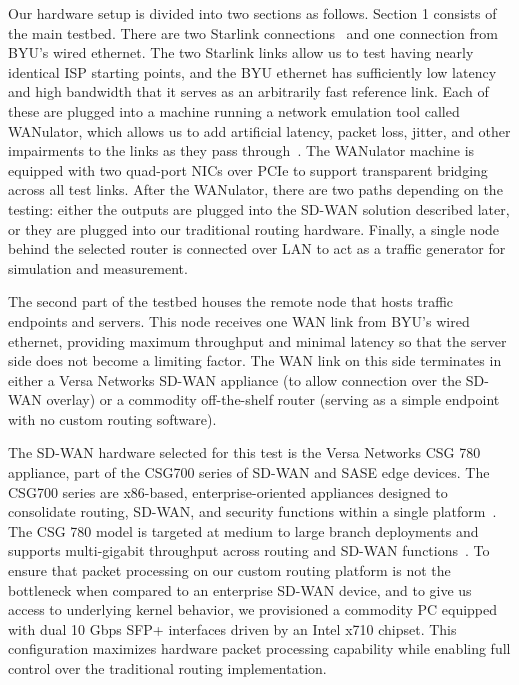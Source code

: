 \documentclass[conference]{IEEEtran}
\begin{document}
Our hardware setup is divided into two sections as follows. Section 1 consists of the main testbed. There are two Starlink connections~\cite{starlink_home} and one connection from BYU’s wired ethernet. The two Starlink links allow us to test having nearly identical ISP starting points, and the BYU ethernet has sufficiently low latency and high bandwidth that it serves as an arbitrarily fast reference link. Each of these are plugged into a machine running a network emulation tool called WANulator, which allows us to add artificial latency, packet loss, jitter, and other impairments to the links as they pass through~\cite{wanulator_home}. The WANulator machine is equipped with two quad-port NICs over PCIe to support transparent bridging across all test links. After the WANulator, there are two paths depending on the testing: either the outputs are plugged into the SD-WAN solution described later, or they are plugged into our traditional routing hardware. Finally, a single node behind the selected router is connected over LAN to act as a traffic generator for simulation and measurement.

The second part of the testbed houses the remote node that hosts traffic endpoints and servers. This node receives one WAN link from BYU’s wired ethernet, providing maximum throughput and minimal latency so that the server side does not become a limiting factor. The WAN link on this side terminates in either a Versa Networks SD-WAN appliance (to allow connection over the SD-WAN overlay) or a commodity off-the-shelf router (serving as a simple endpoint with no custom routing software).

The SD-WAN hardware selected for this test is the Versa Networks CSG 780 appliance, part of the CSG700 series of SD-WAN and SASE edge devices. The CSG700 series are x86-based, enterprise-oriented appliances designed to consolidate routing, SD-WAN, and security functions within a single platform~\cite{versa_csg700_series, versa_csg_appliances}. The CSG 780 model is targeted at medium to large branch deployments and supports multi-gigabit throughput across routing and SD-WAN functions~\cite{versa_csg700_series}. To ensure that packet processing on our custom routing platform is not the bottleneck when compared to an enterprise SD-WAN device, and to give us access to underlying kernel behavior, we provisioned a commodity PC equipped with dual 10 Gbps SFP+ interfaces driven by an Intel x710 chipset. This configuration maximizes hardware packet processing capability while enabling full control over the traditional routing implementation.
\end{document}
